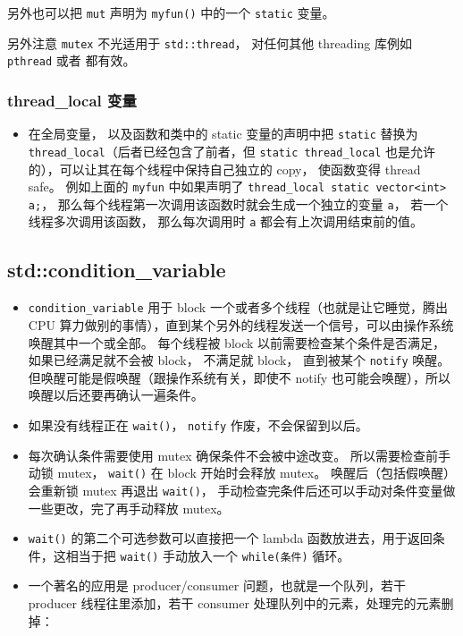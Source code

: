 另外也可以把 \verb`mut` 声明为 \verb`myfun()` 中的一个 \verb`static` 变量。

另外注意 \verb`mutex` 不光适用于 \verb`std::thread`， 对任何其他 threading 库例如 \verb`pthread` 或者  都有效。


\subsubsection{thread\_local 变量}
\begin{itemize}
\item 在全局变量， 以及函数和类中的 static 变量的声明中把 \verb`static` 替换为 \verb`thread_local`（后者已经包含了前者，但 \verb`static thread_local` 也是允许的），可以让其在每个线程中保持自己独立的 copy， 使函数变得 thread safe。 例如上面的 \verb`myfun` 中如果声明了 \verb`thread_local static vector<int> a;`， 那么每个线程第一次调用该函数时就会生成一个独立的变量 \verb`a`， 若一个线程多次调用该函数， 那么每次调用时 \verb`a` 都会有上次调用结束前的值。
\end{itemize}

\subsection{std::condition\_variable}
\begin{itemize}
\item \verb`condition_variable` 用于 block 一个或者多个线程（也就是让它睡觉，腾出 CPU 算力做别的事情），直到某个另外的线程发送一个信号，可以由操作系统唤醒其中一个或全部。 每个线程被 block 以前需要检查某个条件是否满足，如果已经满足就不会被 block， 不满足就 block， 直到被某个 \verb`notify` 唤醒。 但唤醒可能是假唤醒（跟操作系统有关，即使不 notify 也可能会唤醒），所以唤醒以后还要再确认一遍条件。
\item 如果没有线程正在 \verb`wait()`， \verb`notify` 作废，不会保留到以后。
\item 每次确认条件需要使用 mutex 确保条件不会被中途改变。 所以需要检查前手动锁 mutex， \verb`wait()` 在 block 开始时会释放 mutex。 唤醒后（包括假唤醒）会重新锁 mutex 再退出 \verb`wait()`， 手动检查完条件后还可以手动对条件变量做一些更改，完了再手动释放 mutex。
\item \verb`wait()` 的第二个可选参数可以直接把一个 lambda 函数放进去，用于返回条件，这相当于把 \verb`wait()` 手动放入一个 \verb`while(条件)` 循环。
\item 一个著名的应用是 producer/consumer 问题，也就是一个队列，若干 producer 线程往里添加，若干 consumer 处理队列中的元素，处理完的元素删掉：
\end{itemize}

